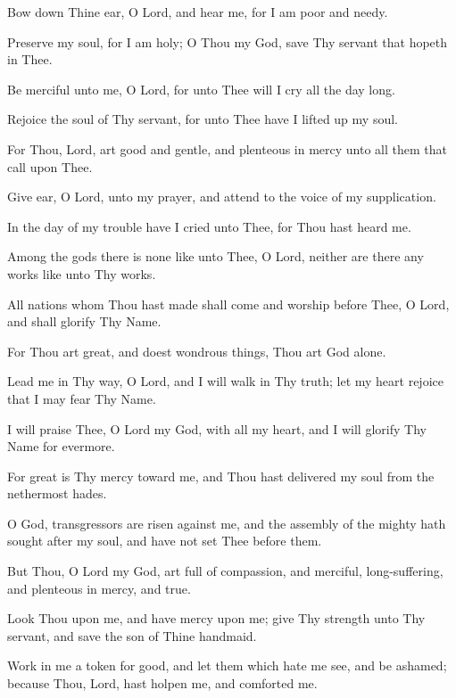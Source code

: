 Bow down Thine ear, O Lord, and hear me, for I am poor and needy.

Preserve my soul, for I am holy; O Thou my God, save Thy servant that hopeth in Thee.

Be merciful unto me, O Lord, for unto Thee will I cry all the day long.

Rejoice the soul of Thy servant, for unto Thee have I lifted up my soul.

For Thou, Lord, art good and gentle, and plenteous in mercy unto all them that call upon Thee.

Give ear, O Lord, unto my prayer, and attend to the voice of my supplication.

In the day of my trouble have I cried unto Thee, for Thou hast heard me.

Among the gods there is none like unto Thee, O Lord, neither are there any works like unto Thy works.

All nations whom Thou hast made shall come and worship before Thee, O Lord, and shall glorify Thy Name.

For Thou art great, and doest wondrous things, Thou art God alone.

Lead me in Thy way, O Lord, and I will walk in Thy truth; let my heart rejoice that I may fear Thy Name.

I will praise Thee, O Lord my God, with all my heart, and I will glorify Thy Name for evermore.

For great is Thy mercy toward me, and Thou hast delivered my soul from the nethermost hades.

O God, transgressors are risen against me, and the assembly of the mighty hath sought after my soul, and have not set Thee before them.

But Thou, O Lord my God, art full of compassion, and merciful, long-suffering, and plenteous in mercy, and true.

Look Thou upon me, and have mercy upon me; give Thy strength unto Thy servant, and save the son of Thine handmaid.

Work in me a token for good, and let them which hate me see, and be ashamed; because Thou, Lord, hast holpen me, and comforted me.

